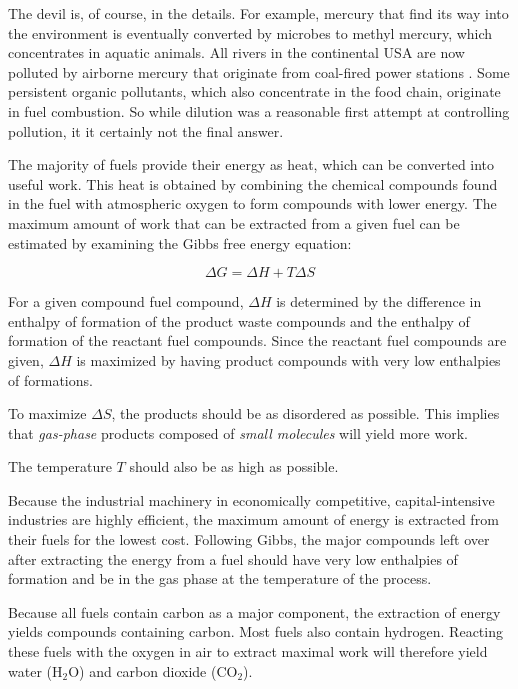 The devil is, of course, in the details. For example, mercury that find its way
into the environment is eventually converted by microbes to methyl mercury,
which concentrates in aquatic animals. All rivers in the continental USA are now
polluted by airborne mercury that originate from coal-fired power stations
\autocite{Wentz2014}. Some persistent organic pollutants, which also concentrate
in the food chain, originate in fuel combustion. So while dilution was a
reasonable first attempt at controlling pollution, it it certainly not the final
answer.

The majority of fuels provide their energy as heat, which can be converted into
useful work. This heat is obtained by combining the chemical compounds found in
the fuel with atmospheric oxygen to form compounds with lower energy. The
maximum amount of work that can be extracted from a given fuel can be estimated
by examining the Gibbs free energy equation:

\begin{equation}
	\Delta G = \Delta H + T \Delta S
\label{eq:Gibbs}
\end{equation}

For a given compound fuel compound, $\Delta H$ is determined by the difference
in enthalpy of formation of the product waste compounds and the enthalpy of
formation of the reactant fuel compounds. Since the reactant fuel compounds are
given, $\Delta H$ is maximized by having product compounds with very low
enthalpies of formations.

To maximize $\Delta S$, the products should be as disordered as possible. This
implies that \emph{gas-phase} products composed of \emph{small molecules} will
yield more work.

The temperature $T$ should also be as high as possible.

Because the industrial machinery in economically competitive, capital-intensive
industries are highly efficient, the maximum amount of energy is extracted from
their fuels for the lowest cost. Following Gibbs, the major compounds left over
after extracting the energy from a fuel should have very low enthalpies of
formation and be in the gas phase at the temperature of the process. 

Because all fuels contain carbon as a major component, the extraction of energy
yields compounds containing carbon. Most fuels also contain hydrogen. Reacting
these fuels with the oxygen in air to extract maximal work will therefore
yield water (H$_2$O) and carbon dioxide (CO$_2$). 

